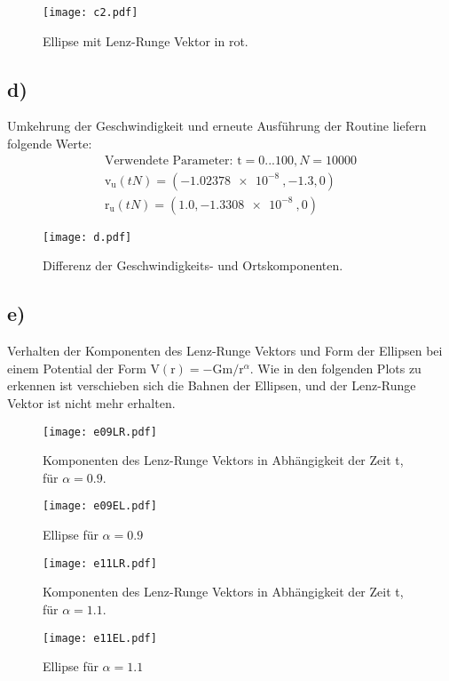 \documentclass[paper=a4, ngerman]{scrartcl}
\begin{document}
\begin{figure}[htbp]
	\centering
	\texttt{[image: c2.pdf]}
	\caption{Ellipse mit Lenz-Runge Vektor in rot.}
	\label{fig:c2}
\end{figure}

\FloatBarrier
\subsection{d)}
Umkehrung der Geschwindigkeit und erneute Ausführung der Routine liefern folgende Werte:
\begin{align}
	\nonumber \text{Verwendete Parameter:  } \mathrm{t}= 0...100, N=10000\\
    \nonumber \mathrm{v}_\mathrm{u}(tN)=(\SI{-1.02378e-8}{}, -1.3, 0) \\
    \nonumber \mathrm{r}_\mathrm{u}(tN)=(1.0, \SI{-1.3308e-8}{}, 0) 
\end{align}
\begin{figure}[htbp]
	\centering
	\texttt{[image: d.pdf]}
	\caption{Differenz der Geschwindigkeits- und Ortskomponenten.}
	\label{fig:d}
\end{figure}

\FloatBarrier
\subsection{e)}
Verhalten der Komponenten des Lenz-Runge Vektors und Form der Ellipsen bei einem Potential der Form $\mathrm{V(r)}=-\mathrm{Gm}/\mathrm{r}^{\alpha}$.
Wie in den folgenden Plots zu erkennen ist verschieben sich die Bahnen der Ellipsen, und der Lenz-Runge Vektor ist nicht mehr erhalten.
\begin{figure}[htbp]
	\centering
	\texttt{[image: e09LR.pdf]}
	\caption{Komponenten des Lenz-Runge Vektors in Abhängigkeit der Zeit t, für $\alpha=0.9$.}
	\label{fig:e09l}
\end{figure}
\begin{figure}[htbp]
	\centering
	\texttt{[image: e09EL.pdf]}
	\caption{Ellipse für $\alpha=0.9$}
	\label{fig:label1}
\end{figure}
\begin{figure}[htbp]
	\centering
	\texttt{[image: e11LR.pdf]}
	\caption{Komponenten des Lenz-Runge Vektors in Abhängigkeit der Zeit t, für $\alpha=1.1$.}
	\label{fig:e1LR}
\end{figure}
\begin{figure}[htbp]
	\centering
	\texttt{[image: e11EL.pdf]}
	\caption{Ellipse für $\alpha=1.1$}
	\label{fig:label2}
\end{figure}
\end{document}
